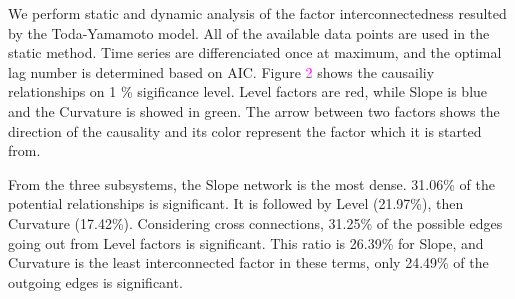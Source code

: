 \documentclass[12pt,bibliography=totoc]{article}
\begin{document}
We perform static and dynamic analysis of the factor interconnectedness resulted by the Toda-Yamamoto model. All of the available data points are used in the static method. Time series are differenciated once at maximum, and the optimal lag number is determined based on AIC. Figure \textcolor{magenta}{2} shows the causailiy relationships on 1 \% sigificance level. Level factors are red, while Slope is blue and the Curvature is showed in green. The arrow between two factors shows the direction of the causality and its color represent the factor which it is started from.


From the three subsystems, the Slope network is the most dense. 31.06\% of the potential relationships is significant. It is followed by Level (21.97\%), then Curvature (17.42\%). Considering cross connections, 31.25\% of the possible edges going out from Level factors is significant. This ratio is 26.39\% for Slope, and Curvature is the least interconnected factor in these terms, only 24.49\% of the outgoing edges is significant.
\end{document}
